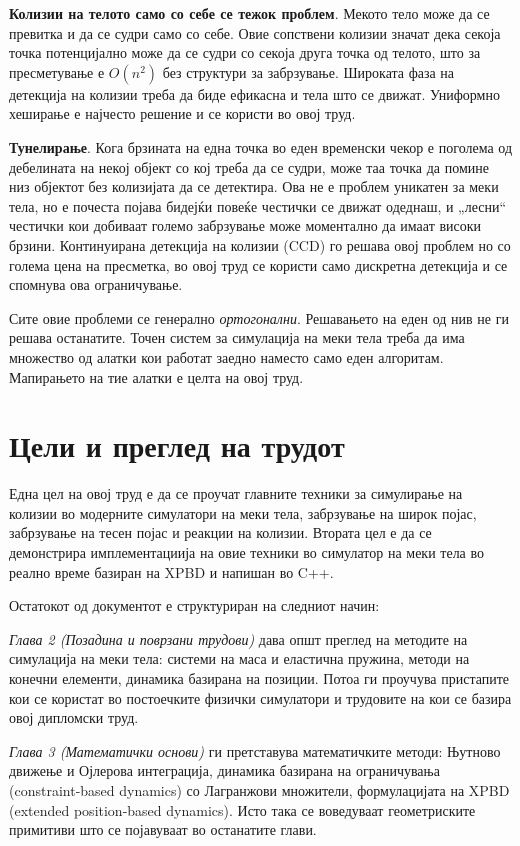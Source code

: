 \textbf{Колизии на телото само со себе се тежок проблем}. Мекото тело може да се превитка и да се судри само со себе. Овие сопствени колизии значат дека секоја точка потенцијално може да се судри со секоја друга точка од телото, што за пресметување е $O(n^2)$ без структури за забрзување. Широката фаза на детекција на колизии треба да биде ефикасна и тела што се движат. Униформно хеширање \cite{teschner2003optimized} е најчесто решение и се користи во овој труд.
	
\textbf{Тунелирање}. Кога брзината на една точка во еден временски чекор е поголема од дебелината на некој објект со кој треба да се судри, може таа точка да помине низ објектот без колизијата да се детектира. Ова не е проблем уникатен за меки тела, но е почеста појава бидејќи повеќе честички се движат одеднаш, и „лесни“ честички кои добиваат големо забрзување може моментално да имаат високи брзини. Континуирана детекција на колизии (CCD) го решава овој проблем но со голема цена на пресметка, во овој труд се користи само дискретна детекција и се спомнува ова ограничување.

Сите овие проблеми се генерално \textit{ортогонални}. Решавањето на еден од нив не ги решава останатите. Точен систем за симулација на меки тела треба да има множество од алатки кои работат заедно наместо само еден алгоритам. Мапирањето на тие алатки е целта на овој труд.

\section{Цели и преглед на трудот}

Една цел на овој труд е да се проучат главните техники за симулирање на колизии во модерните симулатори на меки тела, забрзување на широк појас, забрзување на тесен појас и реакции  на колизии. Втората цел е да се демонстрира имплементациија на овие техники во симулатор на меки тела во реално време базиран на XPBD и напишан во C++. 

Остатокот од документот е структуриран на следниот начин:

\textit{Глава 2 (Позадина и поврзани трудови)} дава општ преглед на методите на симулација на меки тела: системи на маса и еластична пружина, методи на конечни елементи, динамика базирана на позиции. Потоа ги проучува пристапите кои се користат во постоечките физички симулатори и трудовите на кои се базира овој дипломски труд.

\textit{Глава 3 (Математички основи)} ги претставува математичките методи: Њутново движење и Ојлерова интеграција, динамика базирана на ограничувања (constraint-based dynamics) со Лагранжови множители, формулацијата на XPBD (extended position-based dynamics). Исто така се воведуваат геометриските примитиви што се појавуваат во останатите глави.

